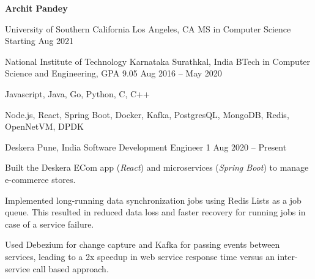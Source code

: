 \documentclass[10pt,letterpaper]{article}
\begin{document}
\begin{center}
	\textbf{\LARGE Archit Pandey}\\[1ex]
\end{center}



\headedsectionfive
{University of Southern California}
{Los Angeles, CA}
{MS in Computer Science}
{Starting Aug 2021}

\headedsectionfive
{National Institute of Technology Karnataka}
{Surathkal, India}
{BTech in Computer Science and Engineering, GPA 9.05}
{Aug 2016 -- May 2020}

\begin{circlist}
	\item Javascript, Java, Go, Python, C, C++
	\item Node.js, React, Spring Boot, Docker, Kafka, PostgresQL, MongoDB, Redis, OpenNetVM, DPDK
\end{circlist}

\headedsection
{Deskera}
{Pune, India}
{Software Development Engineer 1}
{Aug 2020 -- Present}{
	\begin{circlist}
		\item Built the Deskera ECom app (\textit{React}) and microservices (\textit{Spring Boot}) to manage e-commerce stores.
		\item Implemented long-running data synchronization jobs using Redis Lists as a job queue. This resulted in reduced data loss and faster recovery for running jobs in case of a service failure.
		\item Used Debezium for change capture and Kafka for passing events between services, leading to a 2x speedup in web service response time versus an inter-service call based approach.
	\end{circlist}
}
\end{document}
